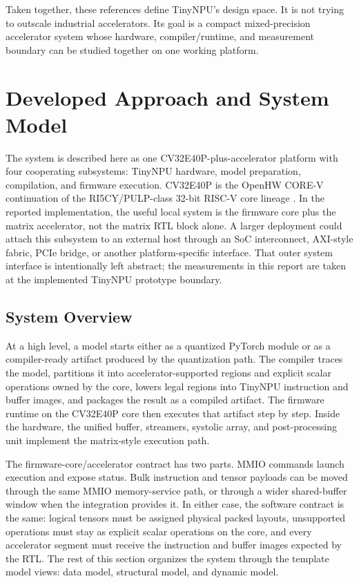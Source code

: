 \documentclass[a4paper, 12pt, titlepage]{article}
\begin{document}
Taken together, these references define TinyNPU's design space. It is not trying to outscale industrial accelerators. Its goal is a compact mixed-precision accelerator system whose hardware, compiler/runtime, and measurement boundary can be studied together on one working platform.
\newpage

\section{Developed Approach and System Model}
The system is described here as one CV32E40P-plus-accelerator platform with four cooperating subsystems: TinyNPU hardware, model preparation, compilation, and firmware execution. CV32E40P is the OpenHW CORE-V continuation of the RI5CY/PULP-class 32-bit RISC-V core lineage \cite{gautschi2017ri5cy}. In the reported implementation, the useful local system is the firmware core plus the matrix accelerator, not the matrix RTL block alone. A larger deployment could attach this subsystem to an external host through an SoC interconnect, AXI-style fabric, PCIe bridge, or another platform-specific interface. That outer system interface is intentionally left abstract; the measurements in this report are taken at the implemented TinyNPU prototype boundary.

\subsection{System Overview}
At a high level, a model starts either as a quantized PyTorch module or as a compiler-ready artifact produced by the quantization path. The compiler traces the model, partitions it into accelerator-supported regions and explicit scalar operations owned by the core, lowers legal regions into TinyNPU instruction and buffer images, and packages the result as a compiled artifact. The firmware runtime on the CV32E40P core then executes that artifact step by step. Inside the hardware, the unified buffer, streamers, systolic array, and post-processing unit implement the matrix-style execution path.

The firmware-core/accelerator contract has two parts. MMIO commands launch execution and expose status. Bulk instruction and tensor payloads can be moved through the same MMIO memory-service path, or through a wider shared-buffer window when the integration provides it. In either case, the software contract is the same: logical tensors must be assigned physical packed layouts, unsupported operations must stay as explicit scalar operations on the core, and every accelerator segment must receive the instruction and buffer images expected by the RTL. The rest of this section organizes the system through the template model views: data model, structural model, and dynamic model.
\end{document}
